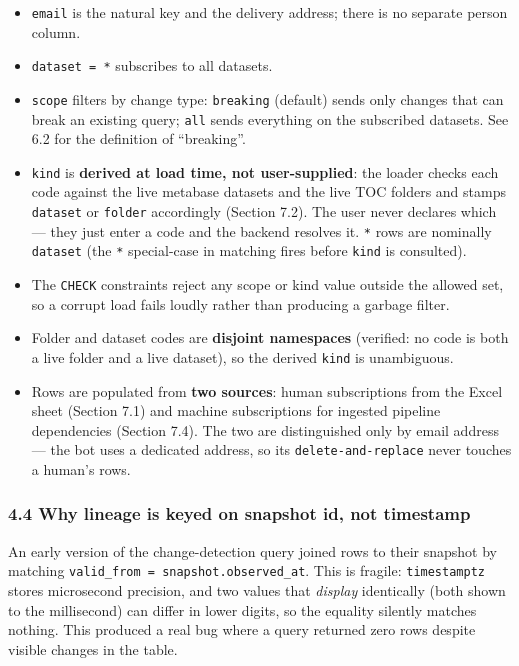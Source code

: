\documentclass[
]{article}
\providecommand{\tightlist}{%
  \setlength{\itemsep}{0pt}\setlength{\parskip}{0pt}}
\begin{document}
\begin{itemize}
\tightlist
\item
  \texttt{email} is the natural key and the delivery address; there is
  no separate person column.
\item
  \texttt{dataset\ =\ \textquotesingle{}*\textquotesingle{}} subscribes
  to all datasets.
\item
  \texttt{scope} filters by change type: \texttt{breaking} (default)
  sends only changes that can break an existing query; \texttt{all}
  sends everything on the subscribed datasets. See 6.2 for the
  definition of ``breaking''.
\item
  \texttt{kind} is \textbf{derived at load time, not user-supplied}: the
  loader checks each code against the live metabase datasets and the
  live TOC folders and stamps \texttt{dataset} or \texttt{folder}
  accordingly (Section 7.2). The user never declares which --- they just
  enter a code and the backend resolves it. \texttt{*} rows are
  nominally \texttt{dataset} (the \texttt{*} special-case in matching
  fires before \texttt{kind} is consulted).
\item
  The \texttt{CHECK} constraints reject any scope or kind value outside
  the allowed set, so a corrupt load fails loudly rather than producing
  a garbage filter.
\item
  Folder and dataset codes are \textbf{disjoint namespaces} (verified:
  no code is both a live folder and a live dataset), so the derived
  \texttt{kind} is unambiguous.
\item
  Rows are populated from \textbf{two sources}: human subscriptions from
  the Excel sheet (Section 7.1) and machine subscriptions for ingested
  pipeline dependencies (Section 7.4). The two are distinguished only by
  email address --- the bot uses a dedicated address, so its
  \texttt{delete-and-replace} never touches a human's rows.
\end{itemize}

\subsubsection{4.4 Why lineage is keyed on snapshot id, not
timestamp}\label{why-lineage-is-keyed-on-snapshot-id-not-timestamp}

An early version of the change-detection query joined rows to their
snapshot by matching \texttt{valid\_from\ =\ snapshot.observed\_at}.
This is fragile: \texttt{timestamptz} stores microsecond precision, and
two values that \emph{display} identically (both shown to the
millisecond) can differ in lower digits, so the equality silently
matches nothing. This produced a real bug where a query returned zero
rows despite visible changes in the table.
\end{document}
